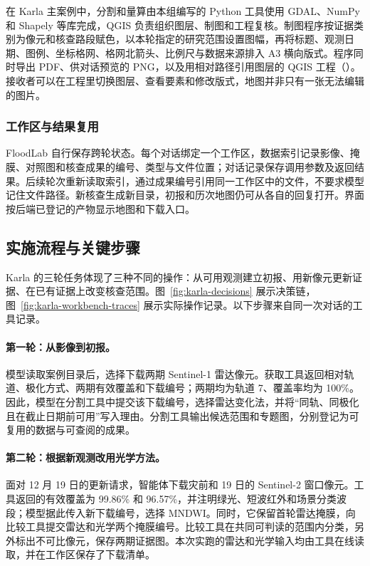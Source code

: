 在 Karla 主案例中，分割和量算由本组编写的 Python 工具使用 GDAL、NumPy 和 Shapely 等库完成，QGIS 负责组织图层、制图和工程复核。制图程序按证据类别为像元和核查路段赋色，以本轮指定的研究范围设置图幅，再将标题、观测日期、图例、坐标格网、格网北箭头、比例尺与数据来源排入 A3 横向版式。程序同时导出 PDF、供对话预览的 PNG，以及用相对路径引用图层的 QGIS 工程（）。接收者可以在工程里切换图层、查看要素和修改版式，地图并非只有一张无法编辑的图片。

\subsubsection{工作区与结果复用}
FloodLab 自行保存跨轮状态。每个对话绑定一个工作区，数据索引记录影像、掩膜、对照图和核查成果的编号、类型与文件位置；对话记录保存调用参数及返回结果。后续轮次重新读取索引，通过成果编号引用同一工作区中的文件，不要求模型记住文件路径。新核查生成新目录，初报和历次地图仍可从各自的回复打开。界面按后端已登记的产物显示地图和下载入口。

\subsection{实施流程与关键步骤}
Karla 的三轮任务体现了三种不同的操作：从可用观测建立初报、用新像元更新证据、在已有证据上改变核查范围。图~\ref{fig:karla-decisions} 展示决策链，图~\ref{fig:karla-workbench-traces} 展示实际操作记录。以下步骤来自同一次对话的工具记录。

\paragraph{第一轮：从影像到初报。}
模型读取案例目录后，选择下载两期 Sentinel-1 雷达像元。获取工具返回相对轨道、极化方式、两期有效覆盖和下载编号；两期均为轨道 7、覆盖率均为 100\%。因此，模型在分割工具中提交该下载编号，选择雷达变化法，并将“同轨、同极化且在截止日期前可用”写入理由。分割工具输出候选范围和专题图，分别登记为可复用的数据与可查阅的成果。

\paragraph{第二轮：根据新观测改用光学方法。}
面对 12 月 19 日的更新请求，智能体下载灾前和 19 日的 Sentinel-2 窗口像元。工具返回的有效覆盖为 99.86\% 和 96.57\%，并注明绿光、短波红外和场景分类波段；模型据此传入新下载编号，选择 MNDWI。同时，它保留首轮雷达掩膜，向比较工具提交雷达和光学两个掩膜编号。比较工具在共同可判读的范围内分类，另外标出不可比像元，保存两期证据图。本次实跑的雷达和光学输入均由工具在线读取，并在工作区保存了下载清单。

